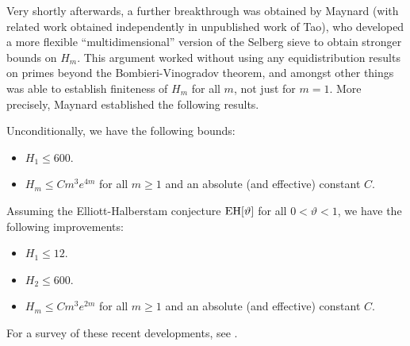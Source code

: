 Very shortly afterwards, a further breakthrough was obtained by Maynard \cite{maynard-new} (with related work obtained independently in unpublished work of Tao), who developed a more flexible ``multidimensional'' version of the Selberg sieve to obtain stronger bounds on $H_m$. This argument worked without using any equidistribution results on primes beyond the Bombieri-Vinogradov theorem, and amongst other things was able to establish finiteness of $H_m$ for all $m$, not just for $m=1$.  More precisely, Maynard established the following results.

\begin{theorem}  Unconditionally, we have the following bounds:
\begin{itemize}
\item[(i)] $H_1 \leq 600$.
\item[(ii)] $H_m \leq C m^3 e^{4m}$ for all $m \geq 1$ and an absolute (and effective) constant $C$.
\end{itemize}
Assuming the Elliott-Halberstam conjecture $\operatorname*{EH}[\vartheta]$ for all $0 < \vartheta < 1$, we have the following improvements:
\begin{itemize}
\item[(iii)] $H_1 \leq 12$.
\item[(iv)] $H_2 \leq 600$.
\item[(v)] $H_m \leq C m^3 e^{2m}$ for all $m \geq 1$ and an absolute (and effective) constant $C$.
\end{itemize}
\end{theorem}

For a survey of these recent developments, see \cite{granville}.  

